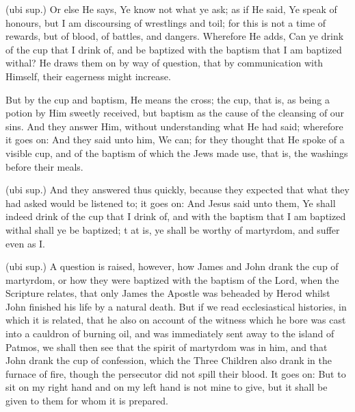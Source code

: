  (ubi sup.) Or else He says, Ye know not what ye ask; as if He said, Ye speak of honours, but I am discoursing of wrestlings and toil; for this is not a time of rewards, but of blood, of battles, and dangers. Wherefore He adds, Can ye drink of the cup that I drink of, and be baptized with the baptism that I am baptized withal? He draws them on by way of question, that by communication with Himself, their eagerness might increase.

 But by the cup and baptism, He means the cross; the cup, that is, as being a potion by Him sweetly received, but baptism as the cause of the cleansing of our sins. And they answer Him, without understanding what He had said; wherefore it goes on: And they said unto him, We can; for they thought that He spoke of a visible cup, and of the baptism of which the Jews made use, that is, the washings before their meals.

 (ubi sup.) And they answered thus quickly, because they expected that what they had asked would be listened to; it goes on: And Jesus said unto them, Ye shall indeed drink of the cup that I drink of, and with the baptism that I am baptized withal shall ye be baptized; t at is, ye shall be worthy of martyrdom, and suffer even as I.

 (ubi sup.) A question is raised, however, how James and John drank the cup of martyrdom, or how they were baptized with the baptism of the Lord, when the Scripture relates, that only James the Apostle was beheaded by Herod whilst John finished his life by a natural death. But if we read ecclesiastical histories, in which it is related, that he also on account of the witness which he bore was cast into a cauldron of burning oil, and was immediately sent away to the island of Patmos, we shall then see that the spirit of martyrdom was in him, and that John drank the cup of confession, which the Three Children also drank in the furnace of fire, though the persecutor did not spill their blood. It goes on: But to sit on my right hand and on my left hand is not mine to give, but it shall be given to them for whom it is prepared.

